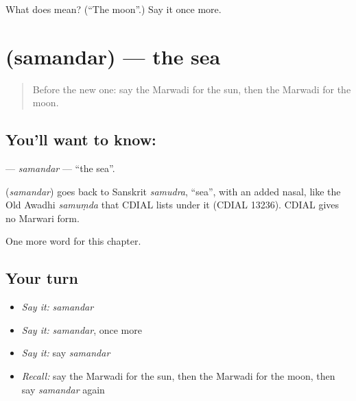 \begin{tcolorbox}[breakable,colback=teal!4,colframe=teal!35!black,title={Before you move on}]
What does  mean? (\textquotedblleft{}The moon\textquotedblright{}.) Say it once more.
\end{tcolorbox}
\section[\texorpdfstring{\mw{समंदर} (samandar)}{समंदर (samandar)}]{ (samandar) — the sea}

\label{lesson:MW-C69-samandar}



\begin{quote}
Before the new one: say the Marwadi for the sun, then the Marwadi for the moon.
\end{quote}

\subsection*{You'll want to know: }
\textbf{} — \emph{samandar} — \textquotedblleft{}the sea\textquotedblright{}.

\begin{cousinweb}
\textbf{} (\emph{samandar}) goes back to Sanskrit \emph{samudra}, \textquotedblleft{}sea\textquotedblright{}, with an added nasal, like the Old Awadhi \emph{samuṃda} that CDIAL lists under it (CDIAL 13236). CDIAL gives no Marwari form.
\end{cousinweb}

\begin{grammarlens}[title={What you've built}]
One more word for this chapter.
\end{grammarlens}

\subsection*{Your turn}
\begin{itemize}
\raggedright
  \item \emph{Say it:} \emph{samandar}
  \item \emph{Say it:} \emph{samandar}, once more
  \item \emph{Say it:} say \emph{samandar}
  \item \emph{Recall:} say the Marwadi for the sun, then the Marwadi for the moon, then say \emph{samandar} again
\end{itemize}

